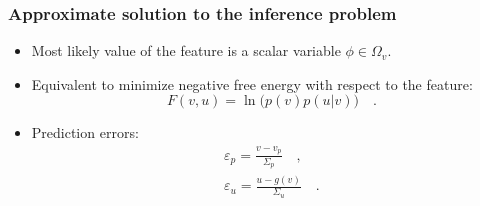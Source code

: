 \documentclass[aspectratio=43]{beamer}
\begin{document}

\begin{frame}
  \frametitle{Approximate solution to the inference problem}
  \begin{itemize}
    \item<1-> Most likely value of the feature is a scalar variable $\phi \in \Omega_v$.
    \item<2-> Equivalent to minimize negative free energy with respect to the feature:
      \begin{equation}
        \label{eq:negative_free_energy}
        F(v, u) = \ln{\big( p(v) p(u|v) \big)}
        \quad .
      \end{equation}
    \item<3-> Prediction errors:
      \begin{align}
        \label{eq:error_prior}
        \varepsilon_p = \frac{v - v_p}{\Sigma_p}
        \quad , \\
        \label{eq:error_stimulus}
        \varepsilon_u = \frac{u - g(v)}{\Sigma_u}
        \quad .
      \end{align}
  \end{itemize}
\end{frame}

\end{document}
